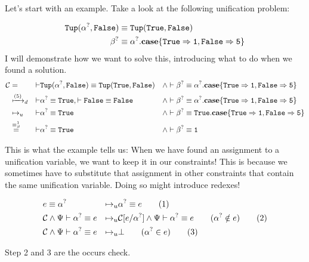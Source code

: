 \documentclass[twoside,12pt,a4paper]{article}
\begin{document}
Let's start with an example. Take a look at the following unification problem:
\begin{example}
    \begin{align*}
        \mathtt{Tup(\alpha^?, False)}&\equiv \mathtt{Tup(True, False)}\\
        \beta^?&\equiv \alpha^?.\textbf{case}\{\mathtt{True \Rightarrow 1, False\Rightarrow 5}\}
    \end{align*}        
    I will demonstrate how we want to solve this, introducing what to do when we found a solution.
    \begin{align*}
        \mathcal{C} &= &\vdash& \mathtt{Tup(\alpha^?, False)}\equiv \mathtt{Tup(True, False)}&\wedge&
        \vdash \beta^?\equiv \alpha^?.\textbf{case}\{\mathtt{True \Rightarrow 1, False\Rightarrow 5}\}\\
        &\xmapsto{(5)}_d &\vdash& \mathtt{\alpha^?\equiv True}, \vdash \mathtt{False\equiv False} &\wedge& 
        \vdash \beta^?\equiv \alpha^?.\textbf{case}\{\mathtt{True \Rightarrow 1, False\Rightarrow 5}\}\\
        &\mapsto_u &\vdash&\mathtt{\alpha^?\equiv True} &\wedge&
        \vdash \beta^?\equiv \mathtt{True}.\textbf{case}\{\mathtt{True \Rightarrow 1, False\Rightarrow 5}\}\\
        &\stackrel{\equiv_{\beta}^1}{=} &\vdash&\mathtt{\alpha^?\equiv True} &\wedge&
        \vdash \beta^?\equiv \mathtt{1}
    \end{align*}      
\end{example}
This is what the example tells us: When we have found an assignment to a unification variable, we want to keep it in our constraints!
This is because we sometimes have to substitute that assignment in other constraints that contain the same unification variable.
Doing so might introduce redexes!
\begin{definition}[Unification]
    \begin{align*}
        & e \equiv\alpha^?
        &\mapsto_u& \alpha^? \equiv e 
        \tag{1}\\
        &\mathcal{C} \wedge \Psi \vdash \alpha^? \equiv e 
        &\mapsto_u& \mathcal{C}[e/\alpha^?] \wedge \Psi \vdash \alpha^? \equiv e \qquad (\alpha^? \notin e)
        \tag{2}\\
        &\mathcal{C} \wedge \Psi \vdash \alpha^? \equiv e
        &\mapsto_u& \bot \qquad(\alpha^?\in e)
        \tag{3}
    \end{align*}
\end{definition}
Step 2 and 3 are the occurs check.
\end{document}

